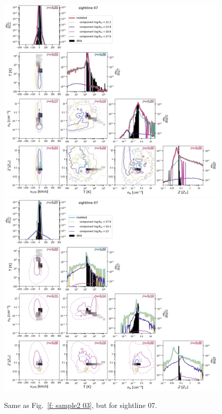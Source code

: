 \documentclass[fleqn,usenatbib]{mnras}
\begin{document}
\begin{figure}
    \centering
    \includegraphics[height=0.45\textheight]{figures/sample2/original/sightline_0007.png}
    \includegraphics[height=0.45\textheight]{figures/sample2/high-z/sightline_0007.png}
    \label{f: sample2 07}
    \caption{Same as Fig.~\ref{f: sample2 03}, but for sightline 07.}
\end{figure}
\end{document}
